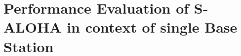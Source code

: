 \chapter{Performance Evaluation of S-ALOHA in context of single Base Station}
\label{chapter:icc17}
\ifpdf
    \graphicspath{{Chapter4/Figs/Raster/}{Chapter4/Figs/PDF/}{Chapter4/Figs/}}
\else
    \graphicspath{{Chapter4/Figs/Vector/}{Chapter4/Figs/}}
\fi







 







